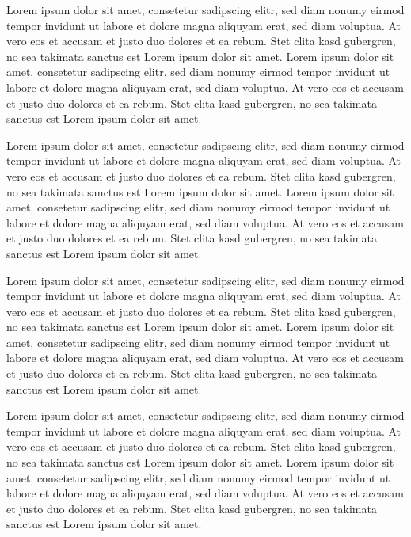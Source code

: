Lorem ipsum dolor sit amet, consetetur sadipscing elitr, sed diam nonumy eirmod tempor invidunt ut labore et dolore magna aliquyam erat, sed diam voluptua. At vero eos et accusam et justo duo dolores et ea rebum. Stet clita kasd gubergren, no sea takimata sanctus est Lorem ipsum dolor sit amet. Lorem ipsum dolor sit amet, consetetur sadipscing elitr, sed diam nonumy eirmod tempor invidunt ut labore et dolore magna aliquyam erat, sed diam voluptua. At vero eos et accusam et justo duo dolores et ea rebum. Stet clita kasd gubergren, no sea takimata sanctus est Lorem ipsum dolor sit amet.

Lorem ipsum dolor sit amet, consetetur sadipscing elitr, sed diam nonumy eirmod tempor invidunt ut labore et dolore magna aliquyam erat, sed diam voluptua. At vero eos et accusam et justo duo dolores et ea rebum. Stet clita kasd gubergren, no sea takimata sanctus est Lorem ipsum dolor sit amet. Lorem ipsum dolor sit amet, consetetur sadipscing elitr, sed diam nonumy eirmod tempor invidunt ut labore et dolore magna aliquyam erat, sed diam voluptua. At vero eos et accusam et justo duo dolores et ea rebum. Stet clita kasd gubergren, no sea takimata sanctus est Lorem ipsum dolor sit amet.

Lorem ipsum dolor sit amet, consetetur sadipscing elitr, sed diam nonumy eirmod tempor invidunt ut labore et dolore magna aliquyam erat, sed diam voluptua. At vero eos et accusam et justo duo dolores et ea rebum. Stet clita kasd gubergren, no sea takimata sanctus est Lorem ipsum dolor sit amet. Lorem ipsum dolor sit amet, consetetur sadipscing elitr, sed diam nonumy eirmod tempor invidunt ut labore et dolore magna aliquyam erat, sed diam voluptua. At vero eos et accusam et justo duo dolores et ea rebum. Stet clita kasd gubergren, no sea takimata sanctus est Lorem ipsum dolor sit amet.

Lorem ipsum dolor sit amet, consetetur sadipscing elitr, sed diam nonumy eirmod tempor invidunt ut labore et dolore magna aliquyam erat, sed diam voluptua. At vero eos et accusam et justo duo dolores et ea rebum. Stet clita kasd gubergren, no sea takimata sanctus est Lorem ipsum dolor sit amet. Lorem ipsum dolor sit amet, consetetur sadipscing elitr, sed diam nonumy eirmod tempor invidunt ut labore et dolore magna aliquyam erat, sed diam voluptua. At vero eos et accusam et justo duo dolores et ea rebum. Stet clita kasd gubergren, no sea takimata sanctus est Lorem ipsum dolor sit amet.


